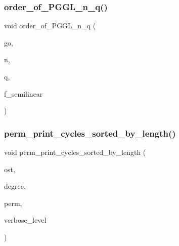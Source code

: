 \mbox{\label{action__global_8_c_ab6d0aa1331a5883ec22f07f131de9462}} 
\subsubsection{\texorpdfstring{order\+\_\+of\+\_\+\+P\+G\+G\+L\+\_\+n\+\_\+q()}{order\_of\_PGGL\_n\_q()}}
{\footnotesize\ttfamily void order\+\_\+of\+\_\+\+P\+G\+G\+L\+\_\+n\+\_\+q (\begin{DoxyParamCaption}\item[{\mbox{\hyperlink{classlonginteger__object}{longinteger\+\_\+object}} \&}]{go,  }\item[{\mbox{\hyperlink{galois_8h_a09fddde158a3a20bd2dcadb609de11dc}{I\+NT}}}]{n,  }\item[{\mbox{\hyperlink{galois_8h_a09fddde158a3a20bd2dcadb609de11dc}{I\+NT}}}]{q,  }\item[{\mbox{\hyperlink{galois_8h_a09fddde158a3a20bd2dcadb609de11dc}{I\+NT}}}]{f\+\_\+semilinear }\end{DoxyParamCaption})}

\mbox{\label{action__global_8_c_a23f865b19a11f2a40298015b3ab69cc6}} 
\subsubsection{\texorpdfstring{perm\+\_\+print\+\_\+cycles\+\_\+sorted\+\_\+by\+\_\+length()}{perm\_print\_cycles\_sorted\_by\_length()}}
{\footnotesize\ttfamily void perm\+\_\+print\+\_\+cycles\+\_\+sorted\+\_\+by\+\_\+length (\begin{DoxyParamCaption}\item[{ostream \&}]{ost,  }\item[{\mbox{\hyperlink{galois_8h_a09fddde158a3a20bd2dcadb609de11dc}{I\+NT}}}]{degree,  }\item[{\mbox{\hyperlink{galois_8h_a09fddde158a3a20bd2dcadb609de11dc}{I\+NT}} $\ast$}]{perm,  }\item[{\mbox{\hyperlink{galois_8h_a09fddde158a3a20bd2dcadb609de11dc}{I\+NT}}}]{verbose\+\_\+level }\end{DoxyParamCaption})}

